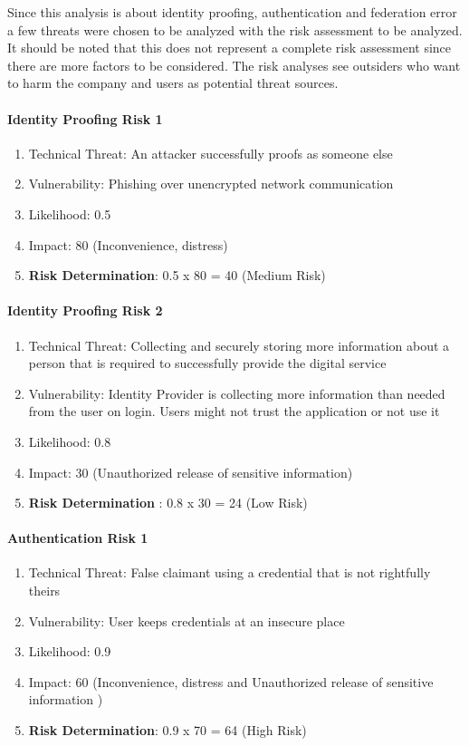 Since this analysis is about identity proofing, authentication and federation error a few threats were chosen to be analyzed with the risk assessment to be analyzed. It should be noted that this does not represent a complete risk assessment since there are more factors to be considered. The risk analyses see outsiders who want to harm the company and users as potential threat sources. 

\paragraph{Identity Proofing Risk 1}

\begin{enumerate}
	\item Technical Threat: An attacker successfully proofs as someone else
	\item Vulnerability: Phishing over unencrypted network communication
	\item Likelihood: 0.5
	\item Impact: 80 (Inconvenience, distress)
	\item \textbf{Risk Determination}: 0.5 x 80 = 40 (Medium Risk) 
\end{enumerate}

\paragraph{Identity Proofing Risk 2}
\begin{enumerate}
	\item Technical Threat: Collecting and securely storing more information about a person that is required to successfully provide the digital service
	\item Vulnerability: Identity Provider is collecting more information than needed from the user on login. Users might not trust the application or not use it
	\item Likelihood: 0.8
	\item Impact: 30  (Unauthorized release of sensitive information)
	\item \textbf{Risk Determination} : 0.8 x 30 = 24 (Low Risk)
\end{enumerate}


\paragraph{Authentication Risk 1}
\begin{enumerate}
	\item Technical Threat: False claimant using a credential that is not rightfully theirs
	\item Vulnerability: User keeps credentials at an insecure place
	\item Likelihood: 0.9
	\item Impact: 60 (Inconvenience, distress and Unauthorized release of sensitive information )
	\item \textbf{Risk Determination}: 0.9 x 70 = 64 (High Risk) 
\end{enumerate}

